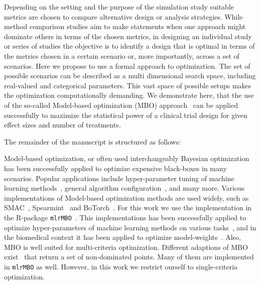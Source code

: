 \documentclass[bimj,fleqn]{w-art}
\theoremstyle{plain}
\theoremstyle{definition}
\begin{document}
Depending on the setting and the purpose of the simulation study suitable metrics are chosen to compare alternative design or analysis strategies. 
While method comparison studies aim to make statements when one approach might dominate others in terms of the chosen metrics, in designing an individual study or series of studies the objective is to identify a design that is optimal in terms of the metrics chosen in a certain scenario or, more importantly, across a set of scenarios. 
Here we propose to use a formal approach to optimization. 
The set of possible scenarios can be described as a multi dimensional search space, including real-valued and categorical parameters.
This vast space of possible setups makes the optimization computationally demanding.
We demonstrate here, that the use of the so-called Model-based optimization (MBO) approach~\citep{jones_taxonomy_2001} can be applied successfully to maximize the statistical power of a clinical trial design for given effect sizes and number of treatments.

The remainder of the manuscript is structured as follows:



Model-based optimization, or often used interchangeably Bayesian optimization has been successfully applied to optimize expensive black-boxes in many scenarios.
Popular applications include hyper-parameter tuning of machine learning methods~\citep{snoek_practical_2012}, general algorithm configuration~\citep{hutter_sequential_2011}, and many more.
Various implementations of Model-based optimization methods are used widely, such as SMAC~\citep{hutter_sequential_2011}, Spearmint~\citep{snoek_practical_2012} and BoTorch~\citep{balandat_botorch_2020}.
For this work we use the implementation in the R-package \texttt{mlrMBO}~\citep{bischl_mlrmbo_2017}.
This implementations has been successfully applied to optimize hyper-parameters of machine learning methods on various tasks~\citep{bischl_mlrmbo_2017, wozniak_candle_2018}, and in the biomedical context it has been applied to optimize model-weights~\citep{richter_modelbased_2019,browaeys_nichenet_2020}.
Also, MBO is well suited for multi-criteria optimization.
Different adaptions of MBO exist~\citep{horn_modelbased_2015} that return a set of non-dominated points.
Many of them are implemented in \texttt{mlrMBO} as well.
However, in this work we restrict ourself to single-criteria optimization. 
\end{document}
